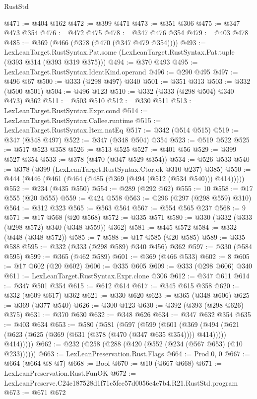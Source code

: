 \begin{lexlean}{RustStd}
\begin{coremodule}
@471 := @404 @162
@472 := @399 @471
@473 := @351 @306
@475 := @347 @473 @354
@476 := @472 @475
@478 := @347 @476 @354
@479 := @403 @478
@485 := @369 (@466 (@378 (@470 (@347 @479 @354))))
@493 := LexLeanTarget.RustSyntax.Pat.some
    (LexLeanTarget.RustSyntax.Pat.tuple (@393 @314 (@393 @319 @375)))
@494 := @370 @493
@495 := LexLeanTarget.RustSyntax.IdentKind.operand
@496 := @290 @495
@497 := @496 @67
@500 := @333 (@298 @497) @340
@501 := @351 @313
@503 := @332 (@500 @501)
@504 := @496 @123
@510 := @332 (@333 (@298 @504) @340 @473) @362
@511 := @503 @510
@512 := @330 @511
@513 := LexLeanTarget.RustSyntax.Expr.cond
@514 := LexLeanTarget.RustSyntax.Callee.runtime
@515 := LexLeanTarget.RustSyntax.Item.natEq
@517 := @342 (@514 @515)
@519 := @347 (@348 @497)
@522 := @347 (@348 @504) @354
@523 := @519 @522
@525 := @517 @523 @358
@526 := @513 @525
@527 := @401 @56
@529 := @399 @527 @354
@533 := @378 (@470 (@347 @529 @354))
@534 := @526 @533
@540 := @378 (@399 (LexLeanTarget.RustSyntax.Ctor.ok @310 @237) @385)
@550 := @444 (@446 (@461 (@464 (@485 (@369 (@494 (@512 (@534 @540))) @414)))))
@552 := @234 (@435 @550)
@554 := @289 (@292 @62)
@555 := 10
@558 := @17 @555 (@20 @555)
@559 := @424 @558
@563 := @296 (@297 (@298 @559) @310)
@564 := @312 @323
@565 := @563 @564
@567 := @554 @565 @237
@568 := 9
@571 := @17 @568 (@20 @568)
@572 := @335 @571
@580 := @330 (@332 (@333 (@298 @572) @340 (@348 @559)) @362)
@581 := @445 @572
@584 := @332 (@448 (@348 @572))
@585 := 7
@588 := @17 @585 (@20 @585)
@589 := @335 @588
@595 := @332 (@333 (@298 @589) @340 @456) @362
@597 := @330 (@584 @595)
@599 := @365 (@462 @589)
@601 := @369 (@466 @533)
@602 := 8
@605 := @17 @602 (@20 @602)
@606 := @335 @605
@609 := @333 (@298 @606) @340
@611 := LexLeanTarget.RustSyntax.Expr.clone @306
@612 := @347 @611
@614 := @347 @501 @354
@615 := @612 @614
@617 := @345 @615 @358
@620 := @332 (@609 @617) @362
@621 := @330 @620
@623 := @365 (@348 @606)
@625 := @369 (@377 @540)
@626 := @300 @123
@630 := @392 (@393 (@298 @626) @375)
@631 := @370 @630
@632 := @348 @626
@634 := @347 @632 @354
@635 := @403 @634
@653 := @580
    (@581
      (@597
        (@599
          (@601
            (@369
              (@494 (@621 (@623 (@625 (@369 (@631 (@378 (@470 (@347 @635 @354)))) @414)))))
              @414)))))
@662 := @232 (@258 (@288 (@420 (@552 (@234 (@567 @653) (@10 @233))))))
@663 := LexLeanPreservation.Rust.Flags
@664 := Prod.{0, 0}
@667 := @664 (@664 @8 @7)
@668 := Bool
@670 := @10 (@667 @668)
@671 := LexLeanPreservation.Rust.FunOK
@672 := LexLeanPreserve.C24c187528d1f71c5fce57d0056e4e7b4.R21.RustStd.program
@673 := @671 @672

\end{coremodule}
\end{lexlean}
